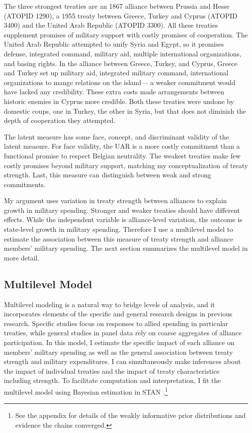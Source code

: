 \documentclass[12pt]{article}
\begin{document}
The three strongest treaties are an 1867 alliance between Prussia and Hesse (ATOPID 1290), a 1955 treaty between Greece, Turkey and Cyprus (ATOPID 3400) and the United Arab Republic (ATOPID 3300).  
All these treaties supplement promises of military support with costly promises of cooperation. 
The United Arab Republic attempted to unify Syria and Egypt, so it promises defense, integrated command, military aid, multiple international organizations, and basing rights. 
In the alliance between Greece, Turkey, and Cyprus, Greece and Turkey set up military aid, integrated military command, international organizations to mange relations on the island--- a weaker commitment would have lacked any credibility. 
These extra costs made arrangements between historic enemies in Cyprus more credible. 
Both these treaties were undone by domestic coups, one in Turkey, the other in Syria, but that does not diminish the depth of cooperation they attempted. 


The latent measure has some face, concept, and discriminant validity of the latent measure. 
For face validity, the UAR is a more costly commitment than a functional promise to respect Belgian neutrality. 
The weakest treaties make few costly promises beyond military support, matching my conceptualization of treaty strength. 
Last, this measure can distinguish between weak and strong commitments. 


My argument uses variation in treaty strength between alliances to explain growth in military spending.
Stronger and weaker treaties should have different effects. 
While the independent variable is alliance-level variation, the outcome is state-level growth in military spending. 
Therefore I use a multilevel model to estimate the association between this measure of treaty strength and alliance members' military spending.  
The next section summarizes the multilevel model in more detail. 


\subsection{Multilevel Model} 


Multilevel modeling is a natural way to bridge levels of analysis, and it incorporates elements of the specific and general research designs in previous research. 
Specific studies focus on responses to allied spending in particular treaties, while general studies in panel data rely on coarse aggregates of alliance participation.
In this model, I estimate the specific impact of each alliance on members' military spending as well as the general association between treaty strength and military expenditures. 
I can simultaneously make inferences about the impact of individual treaties and the impact of treaty characteristics including strength. 
To facilitate computation and interpretation, I fit the multilevel model using Bayesian estimation in STAN \citep{Carpenteretal2016}.\footnote{See the appendix for details of the weakly informative prior distributions and evidence the chains converged.}
\end{document}
